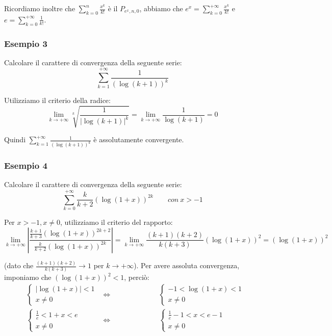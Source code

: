 \documentclass{article}
\begin{document}
\noindent Ricordiamo inoltre che $\sum_{k = 0}^n \frac{x^k}{k!}$ è il $P_{e^x, n, 0}$, abbiamo che $e^x = \sum_{k = 0}^{+\infty} \frac{x^k}{k!}$ e $e = \sum_{k = 0}^{+\infty} \frac{1}{k!}$.

\subsubsection{Esempio 3}
Calcolare il carattere di convergenza della seguente serie:
\begin{equation*}
    \sum_{k = 1}^{+\infty} \frac{1}{(\log(k + 1))^k}
\end{equation*}

\noindent Utilizziamo il criterio della radice:
\begin{equation*}
    \lim_{k \to +\infty} \sqrt[k]{\frac{1}{|\log(k + 1)|^k}} = \lim_{k \to +\infty} \frac{1}{\log(k + 1)} = 0
\end{equation*}

\noindent Quindi $\sum_{k = 1}^{+\infty} \frac{1}{(\log(k + 1))^k}$ è assolutamente convergente.

\subsubsection{Esempio 4}
Calcolare il carattere di convergenza della seguente serie:
\begin{equation*}
    \sum_{k = 0}^{+\infty} \frac{k}{k + 2} (\log(1 + x))^{2k} \qquad con \ x > -1
\end{equation*}

\noindent Per $x > -1, x \neq 0$, utilizziamo il criterio del rapporto:
\begin{equation*}
    \lim_{k \to +\infty} \left|\frac{\frac{k + 1}{k + 3} (\log(1 + x))^{2k + 2}}{\frac{k}{k + 2}(\log(1 + x))^{2k}}\right| = \lim_{k \to +\infty} \frac{(k + 1)(k + 2)}{k(k + 3)} (\log(1 + x))^2 = (\log(1 + x))^2
\end{equation*}

\noindent (dato che $\frac{(k + 1)(k + 2)}{k(k + 3)} \to 1$ per $k \to +\infty$). Per avere assoluta convergenza, imponiamo che $(\log(1 + x))^2 < 1$, perciò:
\begin{align*}
    &\begin{cases}
        |\log(1 + x)| < 1 \\
        x \neq 0
    \end{cases}
    &\iff& \qquad \qquad \qquad
    \begin{cases}
        -1 < \log(1 + x) < 1 \\
        x \neq 0
    \end{cases}
    \\
    &\begin{cases}
        \frac{1}{e} < 1 + x < e \\
        x \neq 0
    \end{cases}
    &\iff& \qquad \qquad \qquad
    \begin{cases}
        \frac{1}{e} - 1 < x < e - 1 \\
        x \neq 0
    \end{cases}
\end{align*}
\end{document}
